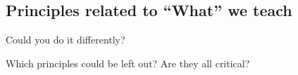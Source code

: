 




\subsection{Principles related to ``What'' we teach} %
\label{sub:principles_related_to_}













Could you do it differently?

Which principles could be left out? Are they all critical?

